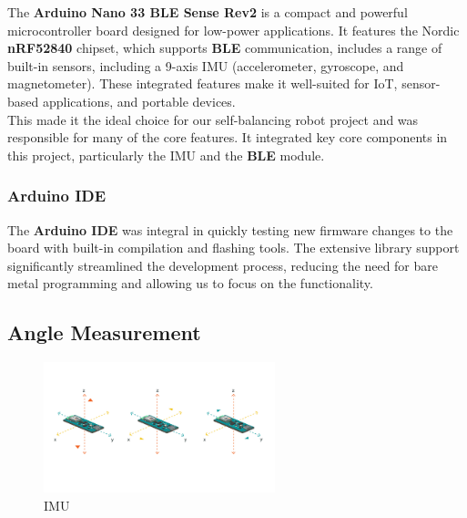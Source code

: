 \documentclass{article}
\begin{document}
\begin{minipage}{\linewidth}
    The \textbf{Arduino Nano 33 BLE Sense Rev2}  is a compact and powerful microcontroller board
    designed for low-power applications. It features the Nordic \textbf{nRF52840} chipset,
    which supports \textbf{BLE} communication, includes a range of built-in sensors,
    including a 9-axis IMU (accelerometer, gyroscope, and magnetometer).
    These integrated features make it well-suited for IoT, sensor-based applications, and portable devices. \\

    This made it the ideal choice for our self-balancing robot project and was responsible for many of the core features.
    It integrated key core components in this project, particularly the IMU and the \textbf{BLE} module. \\
\end{minipage}


\subsubsection{Arduino IDE}

\begin{minipage}{\linewidth}
    The \textbf{Arduino IDE} was integral in quickly testing new firmware changes to the board with built-in compilation and flashing tools.
    The extensive library support significantly streamlined the development process, reducing the need for bare metal programming and allowing us to focus on the functionality.
\end{minipage}


\subsection{Angle Measurement}
\label{sec:angle}

\begin{figure}[H]
    \centering
    \includegraphics[width=0.6\textwidth]{Figures/imu.png} %
    \caption{IMU}
    \label{fig:imu}
\end{figure}
\end{document}
